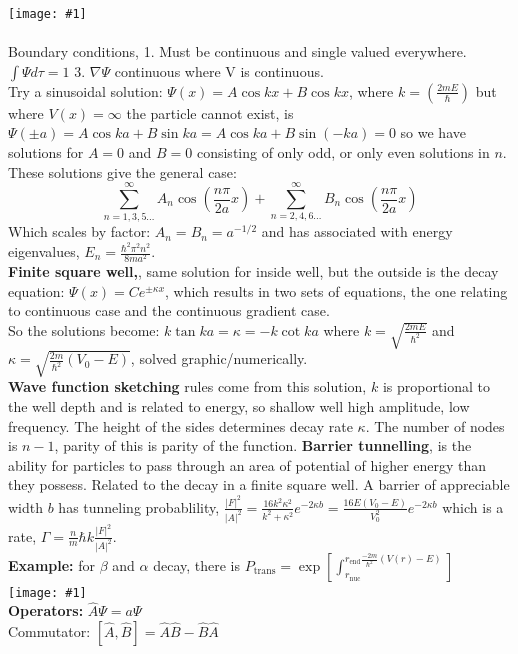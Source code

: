 \documentclass[10pt,landscape,a4paper]{article}
\newcommand{\inlineimage}[1]{\texttt{[image: \#1]}\\}
\newcommand{\inlineimagesize}[2]{\texttt{[image: \#1]}\\}
\renewcommand{\^}[1]{\ensuremath{\hat{#1}}}
\renewcommand{\-}[1]{\text{\sout{\ensuremath{#1}}}}
\begin{document}
\begin{multicols}{4}
	\inlineimagesize{infsquarewell.png}{0.15}\\
	Boundary conditions, 1. Must be continuous and single valued everywhere.$ \int \Psi d\tau = 1 $ 3. $ \nabla\Psi $ continuous where V is continuous.\\
	Try a sinusoidal solution: $ \Psi(x) = A\cos kx + B\cos kx $, where $ k = \left(\frac{2mE}{\hbar}\right) $ but where $ V(x)=\infty $ the particle cannot exist, is $ \Psi(\pm a) = A\cos ka + B\sin ka = A\cos ka + B\sin (-ka) = 0 $ so we have solutions for $ A=0 $ and $ B=0 $ consisting of only odd, or only even solutions in $ n $. These solutions give the general case:
	\[ \sum_{n=1,3,5\ldots}^{\infty} A_n\cos(\frac{n\pi}{2a}x)+ \sum_{n=2,4,6\ldots}^{\infty} B_n\cos(\frac{n\pi}{2a}x) \] 
	Which scales by factor: $ A_n = B_n = a^{-1/2} $ and has associated with energy eigenvalues, $ E_n = \frac{\hbar^2\pi^2n^2}{8ma^2} $.\\
	\textbf{Finite square well,}, same solution for inside well, but the outside is the decay equation: $ \Psi(x) = Ce^{\pm\kappa x} $, which results in two sets of equations, the one relating to continuous case and the continuous gradient case.  \\
	So the solutions become: $ k\tan ka = \kappa = -k\cot ka $ where $ k=\sqrt{\frac{2mE}{\hbar^2}} $ and $ \kappa = \sqrt{\frac{2m}{\hbar^2}(V_0-E)} $, solved graphic/numerically.\\
	\textbf{Wave function sketching} rules come from this solution, $ k $ is proportional to the well depth and is related to energy, so shallow well high amplitude, low frequency. The height of the sides determines decay rate $ \kappa $. The number of nodes is $ n-1 $, parity of this is parity of the function.
	\textbf{Barrier tunnelling}, is the ability for particles to pass through an area of potential of higher energy than they possess. Related to the decay in a finite square well. A barrier of appreciable width $ b $ has tunneling probablility,	$ \frac{|F|^2}{|A|^2} = \frac{16k^2\kappa^2}{k^2+\kappa^2}e^{-2\kappa b} = \frac{16E(V_0-E )}{V_0^2}e^{-2\kappa b} $ which is a rate, $ \Gamma = \frac{n}{m}\hbar k \frac{|F|^2}{|A|^2}  $.\\
	\textbf{Example:} for $ \beta $ and $ \alpha $ decay, there is $ P_\text{trans} = \exp\left[\int_{r_\text{nuc}}^{r_\text{end}\frac{-2m}{\hbar^2}(V(r)-E)}\right] $\\
	\inlineimage{barriertunnelex.png}
	\textbf{Operators:}
	$ \hat{A}\Psi = a\Psi $\\
	Commutator: $ [\hat{A},\hat{B}] = \hat{A}\hat{B}-\hat{B}\hat{A} $

\end{multicols}
\end{document}
